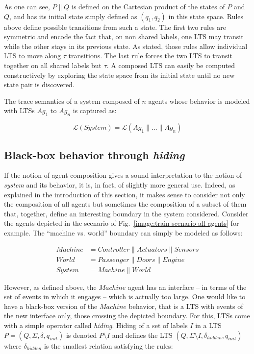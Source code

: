 As one can see, $P \parallel Q$ is defined on the Cartesian product of the states of $P$ and $Q$, and has its initial state simply defined as $(q_1,q_2)$ in this state space. Rules above define possible transitions from such a state. The first two rules are symmetric and encode the fact that, on non shared labels, one LTS may transit while the other stays in its previous state. As stated, those rules allow individual LTS to move along $\tau$ transitions. The last rule forces the two LTS to transit together on all shared labels but $\tau$. A composed LTS can easily be computed constructively by exploring the state space from its initial state until no new state pair is discovered. 

The trace semantics of a system composed of $n$ agents whose behavior is modeled with LTSs $Ag_1$ to $Ag_n$ is captured as:

\begin{equation}
\mathcal{L}(System) = \mathcal{L}(Ag_1 \parallel \ldots \parallel Ag_n)
\label{equation:system-composition}
\end{equation}

\subsection{Black-box behavior through \emph{hiding}}

If the notion of agent composition gives a sound interpretation to the notion of \emph{system} and its behavior, it is, in fact, of slightly more general use. Indeed, as explained in the introduction of this section, it makes sense to consider not only the composition of all agents but sometimes the composition of a subset of them that, together, define an interesting boundary in the system considered. Consider the agents depicted in the scenario of Fig.~\ref{image:train-scenario-all-agents} for example. The ``machine vs. world'' boundary can simply be modeled as follows:

\vspace{-0.8cm}
\begin{align*}
Machine &= Controller \parallel Actuators \parallel Sensors \\
World   &= Passenger \parallel Doors \parallel Engine \\
System  &= Machine \parallel World
\end{align*}
\vspace{-0.8cm}

However, as defined above, the $Machine$ agent has an interface -- in terms of the set of events in which it engages -- which is actually too large. One would like to have a black-box version of the $Machine$ behavior, that is a LTS with events of the new interface only, those crossing the depicted boundary. For this, LTSs come with a simple operator called \emph{hiding}. Hiding of a set of labels $I$ in a LTS $P = (Q,\Sigma,\delta,q_{init})$ is denoted $P \setminus I$ and defines the LTS $(Q,\Sigma \setminus I,\delta_{hidden},q_{init})$ where $\delta_{hidden}$ is the smallest relation satisfying the rules:

